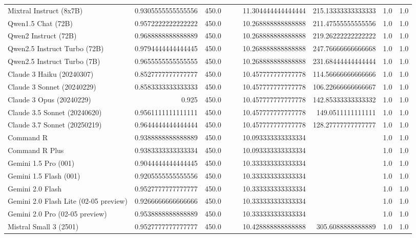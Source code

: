 \begin{table}[htp]
{\begin{tabular}{lrrrrrrrr}
Mixtral Instruct (8x7B) & 0.9305555555555556 & 450.0 &  &  & 11.304444444444444 & 215.13333333333333 & 1.0 & 1.0 \\
Qwen1.5 Chat (72B) & 0.9572222222222222 & 450.0 &  &  & 10.268888888888888 & 211.47555555555556 & 1.0 & 1.0 \\
Qwen2 Instruct (72B) & 0.9688888888888889 & 450.0 &  &  & 10.268888888888888 & 219.26222222222222 & 1.0 & 1.0 \\
Qwen2.5 Instruct Turbo (72B) & 0.9794444444444445 & 450.0 &  &  & 10.268888888888888 & 247.76666666666668 & 1.0 & 1.0 \\
Qwen2.5 Instruct Turbo (7B) & 0.9655555555555555 & 450.0 &  &  & 10.268888888888888 & 231.68444444444444 & 1.0 & 1.0 \\
Claude 3 Haiku (20240307) & 0.8527777777777777 & 450.0 &  &  & 10.457777777777778 & 114.56666666666666 & 1.0 & 1.0 \\
Claude 3 Sonnet (20240229) & 0.8583333333333333 & 450.0 &  &  & 10.457777777777778 & 106.22666666666667 & 1.0 & 1.0 \\
Claude 3 Opus (20240229) & 0.925 & 450.0 &  &  & 10.457777777777778 & 142.85333333333332 & 1.0 & 1.0 \\
Claude 3.5 Sonnet (20240620) & 0.9561111111111111 & 450.0 &  &  & 10.457777777777778 & 149.0511111111111 & 1.0 & 1.0 \\
Claude 3.7 Sonnet (20250219) & 0.9644444444444444 & 450.0 &  &  & 10.457777777777778 & 128.27777777777777 & 1.0 & 1.0 \\
Command R & 0.9388888888888889 & 450.0 &  &  & 10.093333333333334 &  & 1.0 & 1.0 \\
Command R Plus & 0.9383333333333334 & 450.0 &  &  & 10.093333333333334 &  & 1.0 & 1.0 \\
Gemini 1.5 Pro (001) & 0.9044444444444445 & 450.0 &  &  & 10.333333333333334 &  & 1.0 & 1.0 \\
Gemini 1.5 Flash (001) & 0.9205555555555556 & 450.0 &  &  & 10.333333333333334 &  & 1.0 & 1.0 \\
Gemini 2.0 Flash & 0.9527777777777777 & 450.0 &  &  & 10.333333333333334 &  & 1.0 & 1.0 \\
Gemini 2.0 Flash Lite (02-05 preview) & 0.9266666666666666 & 450.0 &  &  & 10.333333333333334 &  & 1.0 & 1.0 \\
Gemini 2.0 Pro (02-05 preview) & 0.9538888888888889 & 450.0 &  &  & 10.333333333333334 &  & 1.0 & 1.0 \\
Mistral Small 3 (2501) & 0.9527777777777777 & 450.0 &  &  & 10.428888888888888 & 305.6088888888889 & 1.0 & 1.0 \\

\end{tabular}}
\end{table}
